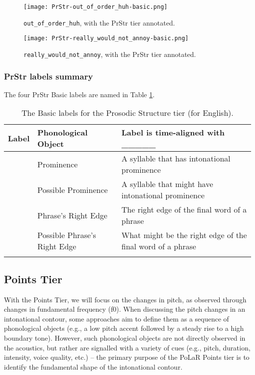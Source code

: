 \begin{figure}[H]
\centering
%
\texttt{[image: PrStr-out\_of\_order\_huh-basic.png]}
%
\caption{\texttt{out\_of\_order\_huh}, with the PrStr tier annotated.%
\label{fig:out_of_order_huh PrStr}%
%
}
\end{figure}

\begin{figure}[H]
\centering
%
\texttt{[image: PrStr-really\_would\_not\_annoy-basic.png]}
%
\caption{\texttt{really\_would\_not\_annoy}, with the PrStr tier annotated.%
\label{fig:really_would_not_annoy PrStr}%
%
}
\end{figure}


\subsubsection{PrStr labels summary}\label{sec:prstr-labels-summary}

The four PrStr Basic labels are named in Table \ref{PrStr basic labels}.

\begin{longtable}{clp{.525\linewidth}} \toprule \textbf{Label} & \textbf{Phonological Object} & \textbf{Label is time-aligned with \_\_\_\_\_}\tabularnewline
\midrule \endhead
\textlabel{*} & Prominence & A syllable that has intonational prominence \tabularnewline
\textlabel{?*} & Possible Prominence & A syllable that might have intonational prominence \tabularnewline
\textlabel{]} & Phrase’s Right Edge & The right edge of the final word of a phrase \tabularnewline
\textlabel{?]} & Possible Phrase’s Right Edge & What might be the right edge of the final word of a phrase \tabularnewline
\bottomrule 
\caption{The Basic labels for the Prosodic Structure tier (for English).%
\label{PrStr basic labels}%
}
\end{longtable}

\subsection{Points Tier}\label{sec:points}

With the Points Tier, we will focus on the changes in pitch, as observed through changes in fundamental frequency (f0). When discussing the pitch changes in an intonational contour, some approaches aim to define them as a sequence of phonological objects (e.g., a low pitch accent followed by a steady rise to a high boundary tone). However, such phonological objects are not directly observed in the acoustics, but rather are signalled with a variety of cues (e.g., pitch, duration, intensity, voice quality, etc.) – the primary purpose of the PoLaR Points tier is to identify the fundamental shape of the intonational contour.

